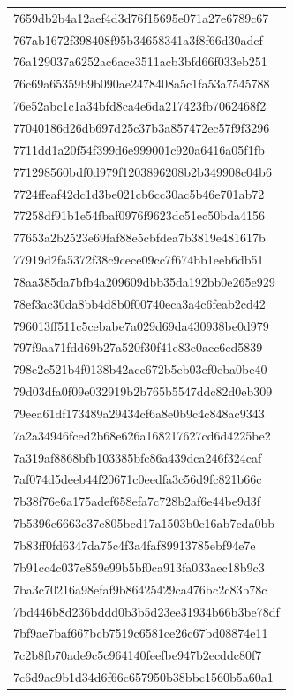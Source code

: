 \begin{tabular}{l}
7659db2b4a12aef4d3d76f15695e071a27e6789c67 \\
767ab1672f398408f95b34658341a3f8f66d30adcf \\
76a129037a6252ac6ace3511acb3bfd66f033eb251 \\
76c69a65359b9b090ae2478408a5c1fa53a7545788 \\
76e52abc1c1a34bfd8ca4e6da217423fb7062468f2 \\
77040186d26db697d25c37b3a857472ec57f9f3296 \\
7711dd1a20f54f399d6e999001c920a6416a05f1fb \\
771298560bdf0d979f1203896208b2b349908c04b6 \\
7724ffeaf42dc1d3be021cb6cc30ac5b46e701ab72 \\
77258df91b1e54fbaf0976f9623dc51ec50bda4156 \\
77653a2b2523e69faf88e5cbfdea7b3819e481617b \\
77919d2fa5372f38c9cece09cc7f674bb1eeb6db51 \\
78aa385da7bfb4a209609dbb35da192bb0e265e929 \\
78ef3ac30da8bb4d8b0f00740eca3a4c6feab2cd42 \\
796013ff511c5cebabe7a029d69da430938be0d979 \\
797f9aa71fdd69b27a520f30f41e83e0acc6cd5839 \\
798e2c521b4f0138b42ace672b5eb03ef0eba0be40 \\
79d03dfa0f09e032919b2b765b5547ddc82d0eb309 \\
79eea61df173489a29434cf6a8e0b9c4c848ac9343 \\
7a2a34946fced2b68e626a168217627cd6d4225be2 \\
7a319af8868bfb103385bfc86a439dca246f324caf \\
7af074d5deeb44f20671c0eedfa3c56d9fc821b66c \\
7b38f76e6a175adef658efa7c728b2af6e44be9d3f \\
7b5396e6663c37c805bcd17a1503b0e16ab7cda0bb \\
7b83ff0fd6347da75c4f3a4faf89913785ebf94e7e \\
7b91cc4c037e859e99b5bf0ca913fa033aec18b9c3 \\
7ba3c70216a98efaf9b86425429ca476bc2c83b78c \\
7bd446b8d236bddd0b3b5d23ee31934b66b3be78df \\
7bf9ae7baf667bcb7519c6581ce26c67bd08874e11 \\
7c2b8fb70ade9c5c964140feefbe947b2ecddc80f7 \\
7c6d9ac9b1d34d6f66c657950b38bbc1560b5a60a1 \\

\end{tabular}
